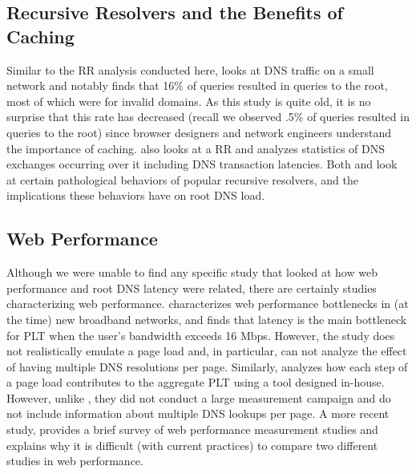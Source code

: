 \documentclass[sigconf,nonacm,10pt]{acmart}
\begin{document}
\subsection{Recursive Resolvers and the Benefits of
Caching}\label{recursive-resolvers-and-the-benefits-of-caching}

Similar to the RR analysis conducted here, \cite{jung2002dns} looks at
DNS traffic on a small network and notably finds that 16\% of queries
resulted in queries to the root, most of which were for invalid domains.
As this study is quite old, it is no surprise that this rate has
decreased (recall we observed .5\% of queries resulted in queries to the
root) since browser designers and network engineers understand the
importance of caching. \cite{callahan2013modern} also looks at a RR and
analyzes statistics of DNS exchanges occurring over it including DNS
transaction latencies. Both \cite{lentz2013d} and \cite{yu2012authority}
look at certain pathological behaviors of popular recursive resolvers,
and the implications these behaviors have on root DNS load.

\subsection{Web Performance}\label{web-performance}

Although we were unable to find any specific study that looked at how
web performance and root DNS latency were related, there are certainly
studies characterizing web performance. \cite{sundaresan2013web}
characterizes web performance bottlenecks in (at the time) new broadband
networks, and finds that latency is the main bottleneck for PLT when the
user's bandwidth exceeds 16 Mbps. However, the study does not
realistically emulate a page load and, in particular, can not analyze
the effect of having multiple DNS resolutions per page. Similarly,
\cite{asrese2016wepr} analyzes how each step of a page load contributes
to the aggregate PLT using a tool designed in-house. However, unlike
\cite{sundaresan2013web}, they did not conduct a large measurement
campaign and do not include information about multiple DNS lookups per
page. A more recent study, \cite{enghardt2019web} provides a brief
survey of web performance measurement studies and explains why it is
difficult (with current practices) to compare two different studies in
web performance.

\iffalse
\end{document}
